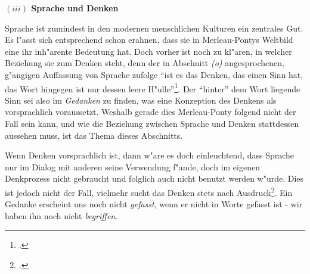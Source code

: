 \documentclass[a4paper, 12pt]{article}
\begin{document}
\begin{onehalfspace}
\vspace{5mm}

\noindent\textbf{$(iii)$ Sprache und Denken}

\noindent Sprache ist zumindest in den modernen menschlichen Kulturen ein zentrales Gut. Es l"asst sich entsprechend schon erahnen, dass sie in Merleau-Pontys Weltbild eine ihr inh"arente Bedeutung hat. Doch vorher ist noch zu kl"aren, in welcher Beziehung sie zum Denken steht, denn der in Abschnitt \emph{(o)} angesprochenen, g"angigen Auffassung von Sprache zufolge "`ist es das Denken, das einen Sinn hat, das Wort hingegen ist nur dessen leere H"ulle"'\footnote{\cite[S. 210]{merleau1966phanomenologie}.}. Der "`hinter"' dem Wort liegende Sinn sei also im \emph{Gedanken} zu finden, was eine Konzeption des Denkens als vorsprachlich voraussetzt. Weshalb gerade dies Merleau-Ponty folgend nicht der Fall sein kann, und wie die Beziehung zwischen Sprache und Denken stattdessen aussehen muss, ist das Thema dieses Abschnitts. 

Wenn Denken vorsprachlich ist, dann w"are es doch einleuchtend, dass Sprache nur im Dialog mit anderen seine Verwendung f"ande, doch im eigenen Denkprozess nicht gebraucht und folglich auch nicht benutzt werden w"urde. Dies ist jedoch nicht der Fall, vielmehr sucht das Denken stets nach Ausdruck\footnote{\cite[Vgl.][S. 216]{merleau1966phanomenologie}.}. Ein Gedanke erscheint uns noch nicht \emph{gefasst}, wenn er nicht in Worte gefasst ist - wir haben ihn noch nicht \emph{begriffen}. 


\end{onehalfspace}
\end{document}
